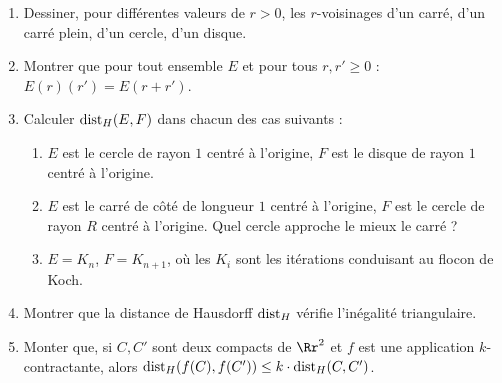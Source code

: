 \documentclass[11pt,class=report,crop=false]{standalone}
\begin{document}
\begin{exercicecours}
\label{exo:ifs2}
\sauteligne
\begin{enumerate}
  \item  Dessiner, pour différentes valeurs de $r>0$, les $r$-voisinages d'un carré, d'un carré plein, d'un cercle, d'un disque.
  
  \item Montrer que pour tout ensemble $E$ et pour tous $r,r' \ge 0$ : $E(r)(r')=E(r+r')$.

 \item Calculer $\text{dist}_H (E,F)$ dans chacun des cas suivants :
  \begin{enumerate}
     \item $E$ est le cercle de rayon $1$ centré à l'origine, $F$ est le disque de rayon $1$ centré à l'origine.

     \item $E$ est le carré de côté de longueur $1$ centré à l'origine, $F$ est le cercle de rayon $R$ centré à l'origine. Quel cercle approche le mieux le carré ?

     \item $E=K_n$, $F=K_{n+1}$, où les $K_i$ sont les itérations conduisant au flocon de Koch.
  \end{enumerate}
 \item Montrer que la distance de Hausdorff $\text{dist}_H$ vérifie l'inégalité triangulaire.
 \item Monter que, si $C, C'$ sont deux compacts de $\Rr^2$ et $f$ est une application
$k$-contractante, alors $\text{dist}_H (f(C),f(C')) \le k \cdot \text{dist}_H (C,C')$.

\end{enumerate}
\end{exercicecours}
\end{document}
